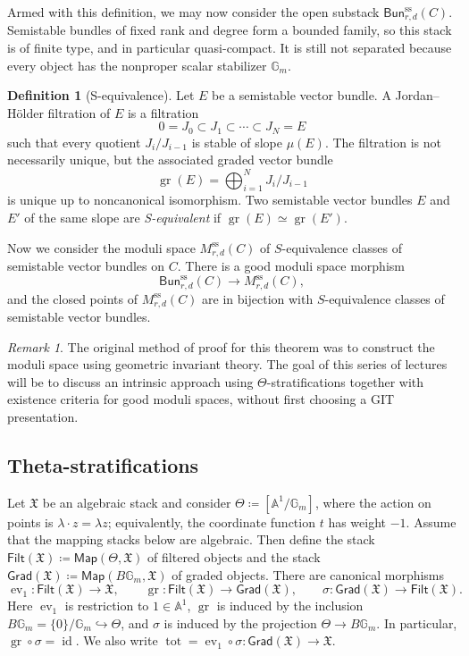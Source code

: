 \documentclass{amsart}
\theoremstyle{definition}
\newtheorem{defn}[thm]{Definition}
\theoremstyle{remark}
\newtheorem{rmk}[thm]{Remark}
\theoremstyle{plain}
\theoremstyle{definition}
\theoremstyle{remark}
\newcommand{\A}{\mathbb{A}}
\newcommand{\G}{\mathbb{G}}
\newcommand{\mf}[1]{\mathfrak{#1}}
\newcommand{\mr}[1]{\mathrm{#1}}
\newcommand{\on}[1]{\operatorname{#1}}
\newcommand{\ms}[1]{\mathsf{#1}}
\newcommand{\1}{\mathbf{1}}
\newcommand{\2}{\mathbf{2}}
\newcommand{\3}{\mathbf{3}}
\DeclareMathOperator{\ev}{ev}
\begin{document}
Armed with this definition, we may now consider the open substack \(\ms{Bun}_{r,d}^{\mr{ss}}(C)\). Semistable bundles of fixed rank and degree form a bounded family, so this stack is of finite type, and in particular quasi-compact. It is still not separated because every object has the nonproper scalar stabilizer \(\G_m\).

\begin{defn}[S-equivalence]
    Let \(E\) be a semistable vector bundle. A Jordan--H\"older filtration of \(E\) is a filtration
    \[ 0=J_0\subset J_1\subset\cdots\subset J_N=E \]
    such that every quotient \(J_i/J_{i-1}\) is stable of slope \(\mu(E)\). The filtration is not necessarily unique, but the associated graded vector bundle
    \[
        \on{gr}(E)=\bigoplus_{i=1}^N J_i/J_{i-1}
    \]
    is unique up to noncanonical isomorphism. Two semistable vector bundles \(E\) and \(E'\) of the same slope are \textit{S-equivalent} if \(\on{gr}(E)\simeq\on{gr}(E')\).
\end{defn}

Now we consider the moduli space \(M_{r,d}^{\mr{ss}}(C)\) of \(S\)-equivalence classes of semistable vector bundles on \(C\). There is a good moduli space morphism
\[
    \ms{Bun}_{r,d}^{\mr{ss}}(C)\longrightarrow M_{r,d}^{\mr{ss}}(C),
\]
and the closed points of \(M_{r,d}^{\mr{ss}}(C)\) are in bijection with \(S\)-equivalence classes of semistable vector bundles.

\begin{rmk}
    The original method of proof for this theorem was to construct the moduli space using geometric invariant theory. The goal of this series of lectures will be to discuss an intrinsic approach using \(\Theta\)-stratifications together with existence criteria for good moduli spaces, without first choosing a GIT presentation.
\end{rmk}


\subsection{Theta-stratifications}%
\label{sub:Theta-stratifications}

Let \(\mf{X}\) be an algebraic stack and consider \(\Theta\coloneqq[\A^1/\G_m]\), where the action on points is \(\lambda\cdot z=\lambda z\); equivalently, the coordinate function \(t\) has weight \(-1\). Assume that the mapping stacks below are algebraic. Then define the stack \(\ms{Filt}(\mf{X})\coloneqq\ms{Map}(\Theta,\mf{X})\) of filtered objects and the stack \(\ms{Grad}(\mf{X})\coloneqq\ms{Map}(B\G_m,\mf{X})\) of graded objects. There are canonical morphisms
\[
    \ev_1\colon\ms{Filt}(\mf{X})\to\mf{X},
    \qquad
    \on{gr}\colon\ms{Filt}(\mf{X})\to\ms{Grad}(\mf{X}),
    \qquad
    \sigma\colon\ms{Grad}(\mf{X})\to\ms{Filt}(\mf{X}).
\]
Here \(\ev_1\) is restriction to \(1\in\A^1\), \(\on{gr}\) is induced by the inclusion \(B\G_m=\{0\}/\G_m\hookrightarrow\Theta\), and \(\sigma\) is induced by the projection \(\Theta\to B\G_m\). In particular, \(\on{gr}\circ\sigma=\on{id}\). We also write \(\on{tot}=\ev_1\circ\sigma\colon\ms{Grad}(\mf{X})\to\mf{X}\).
\end{document}
